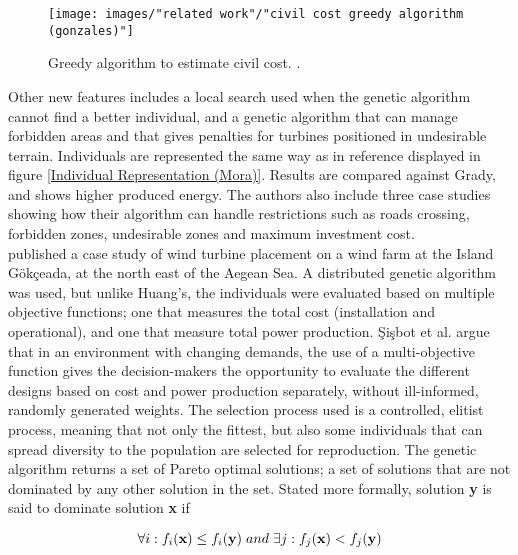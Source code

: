 \begin{figure}[h!]
\begin{center}
\texttt{[image: images/"related work"/"civil cost greedy algorithm (gonzales)"]}
\caption{Greedy algorithm to estimate civil cost. \citep{Gonzalez}.}
\label{Civil Cost Greedy Algorithm (Gonzales)}
\end{center}
\end{figure}


\noindent Other new features includes a local search used when the genetic algorithm cannot find a better individual, and a genetic algorithm that can manage forbidden areas and that gives penalties for turbines positioned in undesirable terrain. Individuals are represented the same way as in reference \cite{Mora} displayed in figure \ref{Individual Representation (Mora)}. Results are compared against Grady, and shows higher produced energy. The authors also include three case studies showing how their algorithm can handle restrictions such as roads crossing, forbidden zones, undesirable zones and maximum investment cost.\\


\noindent \cite{Sisbot} published a case study of wind turbine placement on a wind farm at the Island G{\"o}k\c{c}eada, at the north east of the Aegean Sea. A distributed genetic algorithm was used, but unlike Huang's, the individuals were evaluated based on multiple objective functions; one that measures the total cost (installation and operational), and one that measure total power production. \c{S}i\c{s}bot et al. argue that in an environment with changing demands, the use of a multi-objective function gives the decision-makers the opportunity to evaluate the different designs based on cost and power production separately, without ill-informed, randomly generated weights. The selection process used is a controlled, elitist process, meaning that not only the fittest, but also some individuals that can spread diversity to the population are selected for reproduction. The genetic algorithm returns a set of Pareto optimal solutions; a set of solutions that are not dominated by any other solution in the set. Stated more formally, solution \textbf{y} is said to dominate solution \textbf{x} if

\begin{equation}
\forall i: f_i(\textbf{x}) \leq f_i(\textbf{y}) \hspace{1mm} and \hspace{1mm} \exists j: f_j(\textbf{x}) < f_j(\textbf{y}) 
\label{Dominated solutions}
\end{equation}

